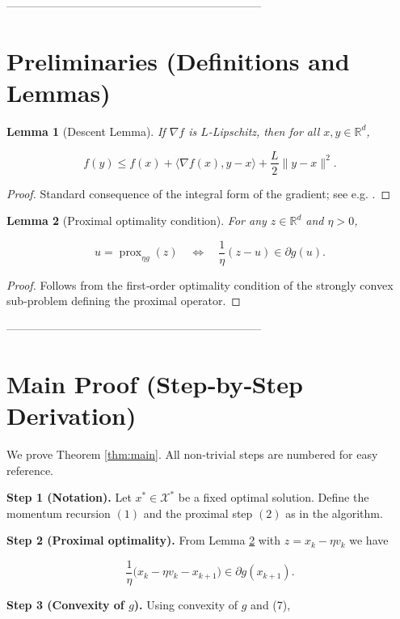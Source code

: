 \documentclass{article}
\newtheorem{lemma}{Lemma}
\newcommand{\prox}{\operatorname{prox}}
\newcommand{\R}{\mathbb{R}}
\begin{document}
--------------------------------------------------------------------

\section*{Preliminaries (Definitions and Lemmas)}
\begin{lemma}[Descent Lemma]\label{lem:descent}
If \(\nabla f\) is \(L\)-Lipschitz, then for all \(x,y\in\R^{d}\),

\[
f(y)\le f(x)+\langle\nabla f(x),y-x\rangle+\frac{L}{2}\|y-x\|^{2}. \tag{5}
\]
\end{lemma}
\begin{proof}
Standard consequence of the integral form of the gradient; see e.g. \cite{nesterov2004intro}.
\end{proof}

\begin{lemma}[Proximal optimality condition]\label{lem:prox-opt}
For any \(z\in\R^{d}\) and \(\eta>0\),

\[
u=\prox_{\eta g}(z)\quad\Longleftrightarrow\quad
\frac{1}{\eta}(z-u)\in\partial g(u). \tag{6}
\]
\end{lemma}
\begin{proof}
Follows from the first‑order optimality condition of the strongly convex
sub‑problem defining the proximal operator.
\end{proof}

--------------------------------------------------------------------

\section*{Main Proof (Step‑by‑Step Derivation)}
We prove Theorem \ref{thm:main}.  
All non‑trivial steps are numbered for easy reference.

\medskip
\noindent\textbf{Step 1 (Notation).}  
Let \(x^{*}\in\mathcal{X}^{*}\) be a fixed optimal solution.
Define the momentum recursion \((1)\) and the proximal step \((2)\) as in the algorithm.

\medskip
\noindent\textbf{Step 2 (Proximal optimality).}  
From Lemma \ref{lem:prox-opt} with \(z=x_{k}-\eta v_{k}\) we have  

\[
\frac{1}{\eta}\bigl(x_{k}-\eta v_{k}-x_{k+1}\bigr)\in\partial g(x_{k+1}). \tag{7}
\]

\medskip
\noindent\textbf{Step 3 (Convexity of \(g\)).}  
Using convexity of \(g\) and (7),
\end{document}
